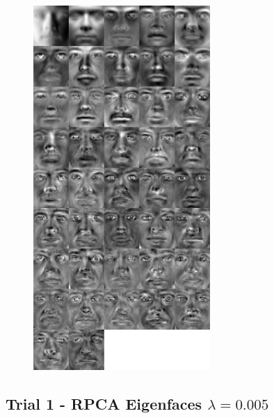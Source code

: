 \documentclass[11pt]{scrartcl} %
\theoremstyle{plain}
\begin{document}
\begin{figure}[H]
\centering
\includegraphics[width=0.6\textwidth]{figures/trial2eigenfaces.jpg}
\end{figure}

\subsection{Trial 1 - RPCA Eigenfaces $\lambda = 0.005$}
\end{document}
